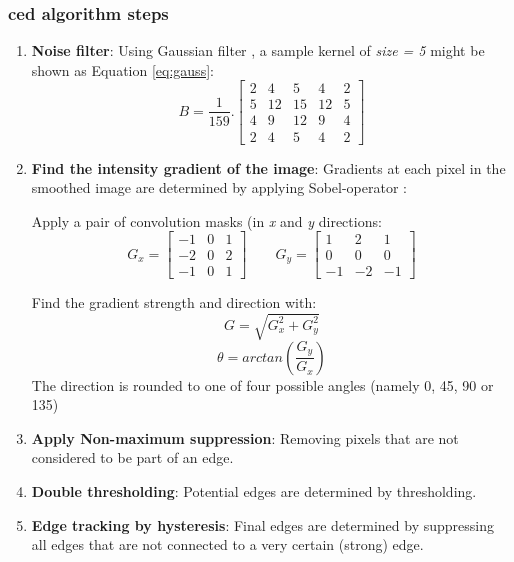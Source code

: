\subsubsection{\acrshort{ced} algorithm steps}
\label{sec:ced_step}
\begin{enumerate}
	\item \textbf{Noise filter}: Using Gaussian filter \nocite{gauss_filter}, a sample kernel of \textit{size = 5} might be shown as Equation \ref{eq:gauss}:
	\begin{equation}
		\label{eq:gauss}
		B = \frac{1}{159} .
		\left[ \begin{array}{ccccc}
		2 & 4 & 5 & 4 & 2 \\
		5 & 12 & 15 & 12 & 5 \\
		4 & 9 & 12 & 9 & 4 \\
		2 & 4 & 5 & 4 & 2
		\end{array} \right]
	\end{equation}

	\item \textbf{Find the intensity gradient of the image}: Gradients at each pixel in the smoothed image are determined by applying Sobel-operator \cite{sobel_alg}:

	Apply a pair of convolution masks (in \textit{x} and \textit{y} directions:
	\begin{equation}
		\label{eq:gx_gy}
		G_x =
		\left[ \begin{array}{ccc}
		-1 & 0 & 1 \\
		-2 & 0 & 2 \\
		-1 & 0 & 1
		\end{array} \right]
		\qquad
		G_y =
		\left[ \begin{array}{ccc}
		1 & 2 & 1 \\
		0 & 0 & 0 \\
		-1 & -2 & -1
		\end{array} \right]
	\end{equation}

	Find the gradient strength and direction with:
	\begin{equation}
		\label{eq:gradient}
		G = \sqrt{G^2_x + G^2_y}
	\end{equation}
	\begin{equation}
		\label{eq:direction}
		\theta = arctan\left(\frac{G_y}{G_x}\right)
	\end{equation}
	The direction is rounded to one of four possible angles (namely 0, 45, 90 or 135)

	\item \textbf{Apply Non-maximum suppression}: Removing pixels that are not considered to be part of an edge.
	\item \textbf{Double thresholding}: Potential edges are determined by thresholding.
	\item \textbf{Edge tracking by hysteresis}: Final edges are determined by suppressing all edges that are not connected to a very certain (strong) edge.
\end{enumerate}

